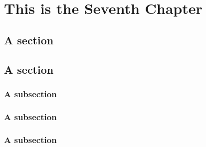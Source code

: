 \documentclass[../ThesisMain]{subfiles}
\begin{document}
\doublespacing%
\chapter{This is the Seventh Chapter}\label{chap:7}
\section{A section}
\lipsum[0-1]%

\section{A section}
\subsection{A subsection}
\lipsum[0-1]%

\subsection{A subsection}
\lipsum[0-1]%

\subsection{A subsection}
\lipsum[0-1]%
\end{document}
